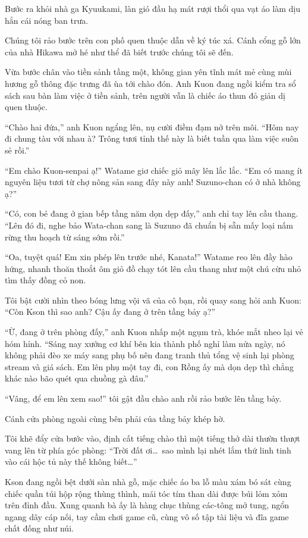 \documentclass[../main.tex]{subfiles}
\begin{document}
\ct

Bước ra khỏi nhà ga Kyuukami, làn gió đầu hạ mát rượi thổi qua vạt áo làm dịu hẳn cái nóng ban trưa.

Chúng tôi rảo bước trên con phố quen thuộc dẫn về ký túc xá. Cánh cổng gỗ lớn của nhà Hikawa mở hé như thể đã biết trước chúng tôi sẽ đến.

Vừa bước chân vào tiền sảnh tầng một, không gian yên tĩnh mát mẻ cùng mùi hương gỗ thông đặc trưng đã ùa tới chào đón. Anh Kuon đang ngồi kiểm tra sổ sách sau bàn làm việc ở tiền sảnh, trên người vẫn là chiếc áo thun đỏ giản dị quen thuộc.

``Chào hai đứa,'' anh Kuon ngẩng lên, nụ cười điềm đạm nở trên môi. ``Hôm nay đi chung tàu với nhau à? Trông tươi tỉnh thế này là biết tuần qua làm việc suôn sẻ rồi.''

``Em chào Kuon-senpai ạ!'' Watame giơ chiếc giỏ mây lên lắc lắc. ``Em có mang ít nguyên liệu tươi từ chợ nông sản sang đây này anh! Suzuno-chan có ở nhà không ạ?''

``Có, con bé đang ở gian bếp tầng năm dọn dẹp đấy,'' anh chỉ tay lên cầu thang. ``Lên đó đi, nghe bảo Wata-chan sang là Suzuno đã chuẩn bị sẵn mấy loại nấm rừng thu hoạch từ sáng sớm rồi.''

``Oa, tuyệt quá! Em xin phép lên trước nhé, Kanata!'' Watame reo lên đầy hào hứng, nhanh thoăn thoắt ôm giỏ đồ chạy tót lên cầu thang như một chú cừu nhỏ tìm thấy đồng cỏ non.

Tôi bật cười nhìn theo bóng lưng vội vã của cô bạn, rồi quay sang hỏi anh Kuon: ``Còn Kson thì sao anh? Cậu ấy đang ở trên tầng bảy ạ?''

``Ừ, đang ở trên phòng đấy,'' anh Kuon nhấp một ngụm trà, khóe mắt nheo lại vẻ hóm hỉnh. ``Sáng nay xưởng cơ khí bên kia thành phố nghỉ làm nửa ngày, nó không phải đèo xe máy sang phụ bố nên đang tranh thủ tổng vệ sinh lại phòng stream và giá sách. Em lên phụ một tay đi, con Rồng ấy mà dọn dẹp thì chẳng khác nào bão quét qua chuồng gà đâu.''

``Vâng, để em lên xem sao!'' tôi gật đầu chào anh rồi rảo bước lên tầng bảy.

\ct

Cánh cửa phòng ngoài cùng bên phải của tầng bảy khép hờ.

Tôi khẽ đẩy cửa bước vào, định cất tiếng chào thì một tiếng thở dài thườn thượt vang lên từ phía góc phòng: ``Trời đất ơi\dots\ sao mình lại nhét lắm thứ linh tinh vào cái hộc tủ này thế không biết\dots''

Kson đang ngồi bệt dưới sàn nhà gỗ, mặc chiếc áo ba lỗ màu xám bó sát cùng chiếc quần túi hộp rộng thùng thình, mái tóc tím than dài được búi lỏm xỏm trên đỉnh đầu. Xung quanh bà ấy là hàng chục thùng các-tông mở tung, ngổn ngang dây cáp nối, tay cầm chơi game cũ, cùng vô số tập tài liệu và đĩa game chất đống như núi.
\end{document}
